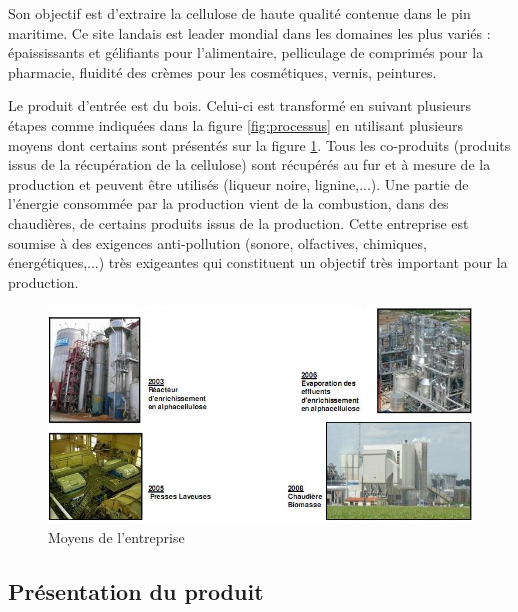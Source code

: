 Son objectif est d'extraire la cellulose de haute qualité contenue dans le pin maritime. Ce site landais est leader mondial dans les domaines les plus variés : épaississants et gélifiants pour l'alimentaire, pelliculage de comprimés pour la pharmacie, fluidité des crèmes pour les cosmétiques, vernis, peintures.

Le produit d'entrée est du bois. Celui-ci est transformé en suivant plusieurs étapes comme indiquées dans la figure \ref{fig:processus} en utilisant plusieurs moyens dont certains sont présentés sur la figure \ref{fig:tartas5}. Tous les co-produits (produits issus de la récupération de la cellulose) sont récupérés au fur et à mesure de la production et peuvent être utilisés (liqueur noire, lignine,...). Une partie de l'énergie consommée par la production vient de la combustion, dans des chaudières, de certains produits issus de la production. Cette entreprise est soumise à des exigences anti-pollution (sonore, olfactives, chimiques, énergétiques,...) très exigeantes qui constituent un objectif très important pour la production.

\begin{figure}[htbp]
	\includegraphics[width=\linewidth]{img/moyens.png}
	\caption{Moyens de l'entreprise}
	\label{fig:tartas5}
\end{figure}

\subsection{Présentation du produit}


